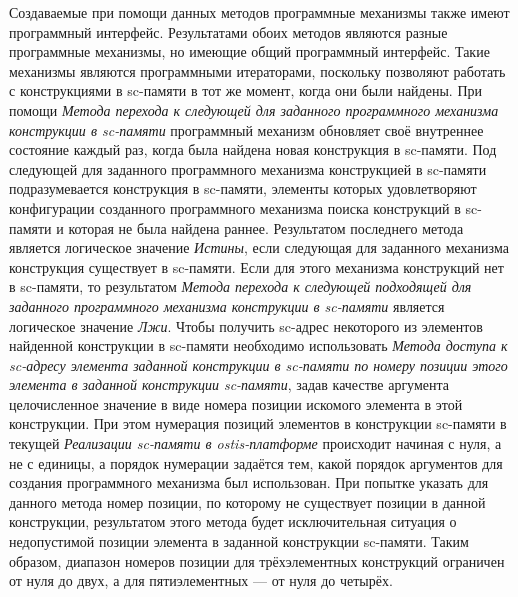 Создаваемые при помощи данных методов программные механизмы также имеют программный интерфейс. Результатами обоих методов являются разные программные механизмы, но имеющие общий программный интерфейс. Такие механизмы являются программными итераторами, поскольку позволяют работать с конструкциями в sc-памяти в тот же момент, когда они были найдены. При помощи \textit{Метода перехода к следующей  для заданного программного механизма конструкции в sc-памяти} программный механизм обновляет своё внутреннее состояние каждый раз, когда была найдена новая конструкция в sc-памяти. Под следующей  для заданного программного механизма конструкцией в sc-памяти подразумевается конструкция в sc-памяти, элементы которых удовлетворяют конфигурации созданного программного механизма поиска конструкций в sc-памяти и которая не была найдена раннее. Результатом последнего метода является логическое значение \textit{Истины}, если следующая  для заданного механизма конструкция существует в sc-памяти. Если  для этого механизма конструкций нет в sc-памяти, то результатом \textit{Метода перехода к следующей подходящей для заданного программного механизма конструкции в sc-памяти} является логическое значение \textit{Лжи}. Чтобы получить sc-адрес некоторого из элементов найденной конструкции в sc-памяти необходимо использовать \textit{Метода доступа к sc-адресу элемента заданной конструкции в sc-памяти по номеру позиции этого элемента в заданной конструкции sc-памяти}, задав качестве аргумента целочисленное значение в виде номера позиции искомого элемента в этой конструкции. При этом нумерация позиций элементов в конструкции sc-памяти в текущей \textit{Реализации sc-памяти в ostis-платформе} происходит начиная с нуля, а не с единицы, а порядок нумерации задаётся тем, какой порядок аргументов для создания программного механизма был использован. При попытке указать для данного метода номер позиции, по которому не существует позиции в данной конструкции, результатом этого метода будет исключительная ситуация о недопустимой позиции элемента в заданной конструкции sc-памяти. Таким образом, диапазон номеров позиции для трёхэлементных конструкций ограничен от нуля до двух, а для пятиэлементных --- от нуля до четырёх.

